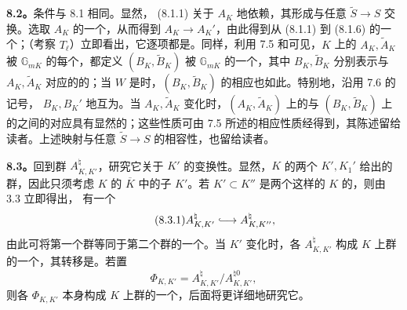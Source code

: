 \textbf{8.2。}条件与 8.1 相同。显然， (8.1.1) 关于 $A_K$ 地依赖，其形成与任意 $\widetilde S\to S$ 交换。选取 $A_K$ 的一个，从而得到 $A_K\to A_K'$，由此得到从 (8.1.1) 到 (8.1.6) 的一个；（考察 $T_\ell$）立即看出，它逐项都是。同样，利用 7.5 和可见，$K$ 上的 $A_K,\widetilde A_K$ 被 $\mathbb G_{mK}$ 的每个，都定义 $(B_K,\widetilde B_K)$ 被 $\mathbb G_{mK}$ 的一个，其中 $B_K,\widetilde B_K$ 分别表示与 $A_K,\widetilde A_K$ 对应的的；当 $W$ 是时，$(B_K,\widetilde B_K)$ 的相应也如此。特别地，沿用 7.6 的记号， $B_K,B_K'$ 地互为。当 $A_K,\widetilde A_K$ 变化时，$(A_K,\widetilde A_K)$ 上的与 $(B_K,\widetilde B_K)$ 上的之间的对应具有显然的；这些性质可由 7.5 所述的相应性质经得到，其陈述留给读者。上述映射与任意 $\widetilde S\to S$ 的相容性，也留给读者。

\textbf{8.3。}回到群 $A_{K,K'}^\natural$，研究它关于 $K'$ 的变换性。显然，$K$ 的两个 $K',K_1'$ 给出的群，因此只须考虑 $K$ 的 $\overline K$ 中的子 $K'$。若 $K'\subset K''$ 是两个这样的 $K$ 的，则由 3.3 立即得出，
有一个
\begin{equation}\tag{8.3.1}
 A_{K,K'}^\natural\lhook\joinrel\longrightarrow A_{K,K''}^\natural,
\end{equation}
由此可将第一个群等同于第二个群的一个。当 $K'$ 变化时，各 $A_{K,K'}^\natural$ 构成 $K$ 上群的一个，其转移是。若置
\begin{equation}\tag{8.3.2}
 \Phi_{K,K'}=A_{K,K'}^\natural/A_{K,K'}^{\natural0},
\end{equation}
则各 $\Phi_{K,K'}$ 本身构成 $K$ 上群的一个，后面将更详细地研究它。

